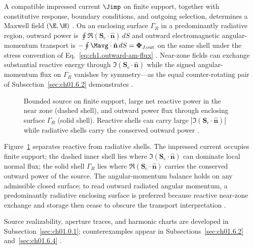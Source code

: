 A compatible impressed current $\Jimp$ on finite support, together with constitutive
response, boundary conditions, and outgoing selection, determines a Maxwell field
$(\E,\H)$ \cite{maxwell1873,stratton1941}. On an enclosing surface $\Gamma_R$ in
a predominantly radiative region, outward power is
$\oint \Re(\mathbf{S}_\mathrm{c}\cdot\hat{\mathbf{n}})\,dS$ and outward electromagnetic angular-momentum transport is
$-\oint \Mavg\cdot\hat{\mathbf{n}}\,dS=\boldsymbol{\Phi}_{J,\mathrm{out}}$ on the same shell under the stress convention of Eq.~\eqref{eq:ch1.outward-am-flux} \cite{beth1936}.
Near-zone fields can exchange substantial reactive energy through
$\Im(\mathbf{S}_\mathrm{c}\cdot\hat{\mathbf{n}})$ while the signed angular-momentum flux on
$\Gamma_R$ vanishes by symmetry---as the equal counter-rotating pair of
Subsection~\ref{sec:ch01.6.2} demonstrates \cite{allen1992}.

\begin{figure}[t]
\centering
\VolIPhysFig{\VolIPhysReactiveVsRadiative}
\caption{Bounded source on finite support, large net reactive power in the near zone (dashed shell), and outward power flux through enclosing surface $\Gamma_R$ (solid shell). Reactive shells can carry large $|\Im(\mathbf{S}_\mathrm{c}\cdot\hat{\mathbf{n}})|$ while radiative shells carry the conserved outward power \cite{poynting1884,chu1948}.}
\label{fig:ch1.master-philosophy}
\end{figure}

Figure~\ref{fig:ch1.master-philosophy} separates reactive from radiative shells.
The impressed current occupies finite support; the dashed inner shell lies where
$\Im(\mathbf{S}_\mathrm{c}\cdot\hat{\mathbf{n}})$ can dominate local normal
flux; the solid shell $\Gamma_R$ lies where
$\Re(\mathbf{S}_\mathrm{c}\cdot\hat{\mathbf{n}})$ carries the conserved outward power of the
source. The angular-momentum balance holds on any admissible closed surface; to read outward radiated angular momentum, a predominantly radiative enclosing surface is preferred because reactive near-zone exchange and storage then cease to obscure the transport interpretation \cite{chu1948,stratton1941}.

Source realizability, aperture traces, and harmonic charts are developed in Subsection~\ref{sec:ch01.0.1}; counterexamples appear in Subsections~\ref{sec:ch01.6.2} and~\ref{sec:ch01.6.4} \cite{stratton1941,harrington2001}.
\label{thm:ch1.realizability-hierarchy}\label{prin:ch1.rep-physics}\label{def:ch1.hierarchy-classes}\label{hier:ch1.angular-status}\label{prin:ch1.finite-geometry-angular}\label{prin:ch1.accessibility}

